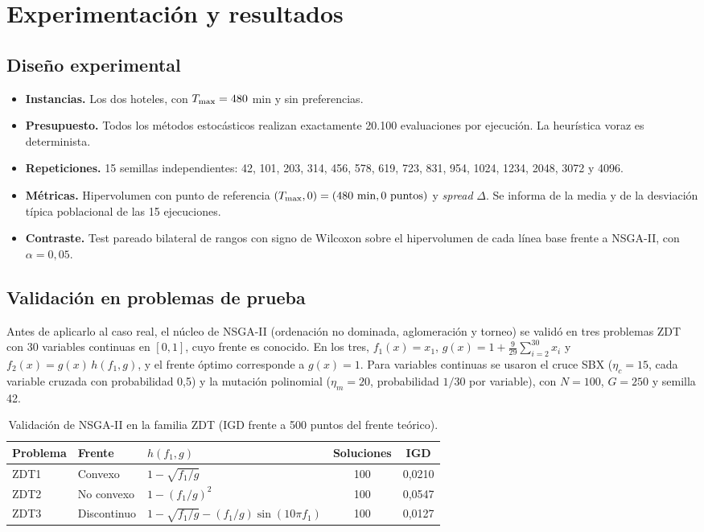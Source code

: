 \section{Experimentación y resultados}
\label{sec:experimentacion}

\subsection{Diseño experimental}

\begin{itemize}
  \item \textbf{Instancias.} Los dos hoteles, con $T_{\max} = 480$ min y sin preferencias.
  \item \textbf{Presupuesto.} Todos los métodos estocásticos realizan exactamente 20.100 evaluaciones por ejecución. La heurística voraz es determinista.
  \item \textbf{Repeticiones.} 15 semillas independientes: 42, 101, 203, 314, 456, 578, 619, 723, 831, 954, 1024, 1234, 2048, 3072 y 4096.
  \item \textbf{Métricas.} Hipervolumen con punto de referencia $(\Tmax, 0) = (480\ \text{min}, 0\ \text{puntos})$ y \emph{spread} $\Delta$. Se informa de la media y de la desviación típica poblacional de las 15 ejecuciones.
  \item \textbf{Contraste.} Test pareado bilateral de rangos con signo de Wilcoxon sobre el hipervolumen de cada línea base frente a NSGA-II, con $\alpha = 0{,}05$.
\end{itemize}

\subsection{Validación en problemas de prueba}
\label{sec:zdt}

Antes de aplicarlo al caso real, el núcleo de NSGA-II (ordenación no dominada, aglomeración y torneo) se validó en tres problemas ZDT \citep{zitzler2000} con 30 variables continuas en $[0,1]$, cuyo frente es conocido. En los tres, $f_1(x) = x_1$, $g(x) = 1 + \frac{9}{29}\sum_{i=2}^{30} x_i$ y $f_2(x) = g(x)\,h(f_1, g)$, y el frente óptimo corresponde a $g(x) = 1$. Para variables continuas se usaron el cruce SBX ($\eta_c = 15$, cada variable cruzada con probabilidad 0,5) y la mutación polinomial ($\eta_m = 20$, probabilidad $1/30$ por variable), con $N = 100$, $G = 250$ y semilla 42.

\begin{table}[H]
\centering
\small
\caption{Validación de NSGA-II en la familia ZDT (IGD frente a 500 puntos del frente teórico).}
\label{tab:zdt}
\begin{tabular}{@{}l l l c c@{}}
\toprule
Problema & Frente & $h(f_1, g)$ & Soluciones & IGD \\
\midrule
ZDT1 & Convexo & $1 - \sqrt{f_1/g}$ & 100 & 0,0210 \\
ZDT2 & No convexo & $1 - (f_1/g)^2$ & 100 & 0,0547 \\
ZDT3 & Discontinuo & $1 - \sqrt{f_1/g} - (f_1/g)\sin(10\pi f_1)$ & 100 & 0,0127 \\
\bottomrule
\end{tabular}
\end{table}

